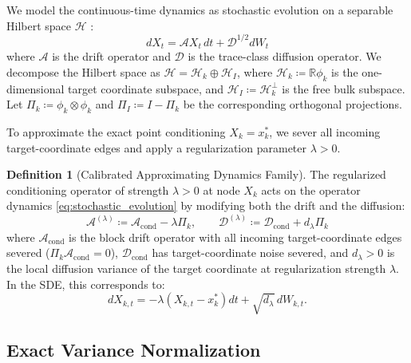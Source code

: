 \documentclass[11pt]{amsart}
\theoremstyle{plain}
\theoremstyle{definition}
\newtheorem{definition}[theorem]{Definition}
\theoremstyle{remark}
\newcommand{\cond}{\operatorname{cond}}
\begin{document}
    We model the continuous-time dynamics as stochastic evolution on a separable Hilbert space $\mathcal{H}$ \cite{daprato2014stochastic}:
    \begin{equation}
        \label{eq:stochastic_evolution}
        dX_t = \mathcal{A} X_t \, dt + \mathcal{D}^{1/2} dW_t
    \end{equation}
    where $\mathcal{A}$ is the drift operator and $\mathcal{D}$ is the trace-class diffusion operator. We decompose the Hilbert space as $\mathcal{H} = \mathcal{H}_k \oplus \mathcal{H}_I$, where $\mathcal{H}_k \coloneqq \mathbb{R}\phi_k$ is the one-dimensional target coordinate subspace, and $\mathcal{H}_I \coloneqq \mathcal{H}_k^\perp$ is the free bulk subspace. Let $\Pi_k \coloneqq \phi_k \otimes \phi_k$ and $\Pi_I \coloneqq I - \Pi_k$ be the corresponding orthogonal projections.

    To approximate the exact point conditioning $X_k = x_k^*$, we sever all incoming target-coordinate edges and apply a regularization parameter $\lambda > 0$.

    \begin{definition}[Calibrated Approximating Dynamics Family]
        \label{def:soft_do}
        The regularized conditioning operator of strength $\lambda > 0$ at node $X_k$ acts on the operator dynamics \eqref{eq:stochastic_evolution} by modifying both the drift and the diffusion:
        \begin{equation}
            \label{eq:soft_do_sde}
            \mathcal{A}^{(\lambda)} \coloneqq \mathcal{A}_{\cond} - \lambda \Pi_k, \qquad
            \mathcal{D}^{(\lambda)} \coloneqq \mathcal{D}_{\cond} + d_\lambda \Pi_k
        \end{equation}
        where $\mathcal{A}_{\cond}$ is the block drift operator with all incoming target-coordinate edges severed ($\Pi_k \mathcal{A}_{\cond} = 0$), $\mathcal{D}_{\cond}$ has target-coordinate noise severed, and $d_\lambda > 0$ is the local diffusion variance of the target coordinate at regularization strength $\lambda$. In the SDE, this corresponds to:
        \begin{equation}
            \label{eq:soft_do_sde_general}
            dX_{k,t} = -\lambda (X_{k,t} - x_k^*) dt + \sqrt{d_\lambda}\, dW_{k,t}.
        \end{equation}
    \end{definition}

    \subsection{Exact Variance Normalization}
    \label{sec:setup:calibration}
\end{document}
